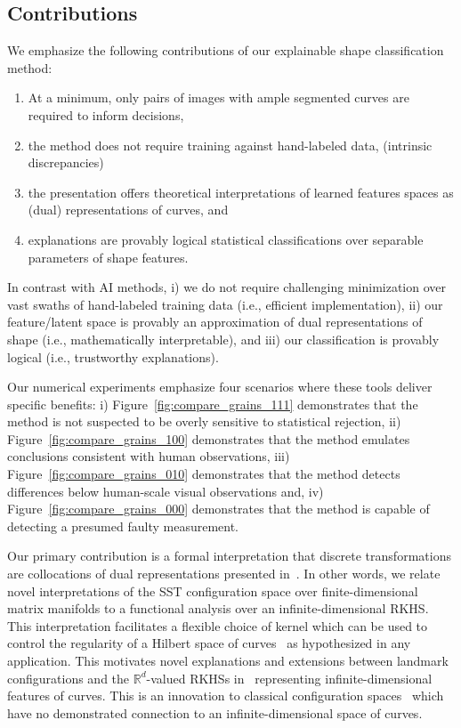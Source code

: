 \documentclass[pdflatex,iicol]{sn-jnl}%
\theoremstyle{thmstyleone}%
\theoremstyle{thmstyletwo}%
\theoremstyle{thmstylethree}%
\begin{document}
\subsection{Contributions}
We emphasize the following contributions of our explainable shape classification method:
\begin{enumerate}
    \item At a minimum, only pairs of images with ample segmented curves are required to inform decisions,
    \item the method does not require training against hand-labeled data, (intrinsic discrepancies)
    \item the presentation offers theoretical interpretations of learned features spaces as (dual) representations of curves, and 
    \item explanations are provably logical statistical classifications over separable parameters of shape features.
\end{enumerate}
 
 In contrast with AI methods, i) we do not require challenging minimization over vast swaths of hand-labeled training data (i.e., efficient implementation), ii) our feature/latent space is provably an approximation of dual representations of shape (i.e., mathematically interpretable), and iii) our classification is provably logical (i.e., trustworthy explanations).

Our numerical experiments emphasize four scenarios where these tools deliver specific benefits: i) Figure~\ref{fig:compare_grains_111} demonstrates that the method is not suspected to be overly sensitive to statistical rejection, ii) Figure~\ref{fig:compare_grains_100} demonstrates that the method emulates conclusions consistent with human observations, iii) Figure~\ref{fig:compare_grains_010} demonstrates that the method detects differences below human-scale visual observations and, iv) Figure~\ref{fig:compare_grains_000} demonstrates that the method is capable of detecting a presumed faulty measurement.

Our primary contribution is a formal interpretation that discrete transformations are collocations of dual representations presented in~\cite{micheli2013matrix}. In other words, we relate novel interpretations of the SST configuration space over finite-dimensional matrix manifolds to a functional analysis over an infinite-dimensional RKHS. This interpretation facilitates a flexible choice of kernel which can be used to control the regularity of a Hilbert space of curves~\cite{micheli2013matrix} as hypothesized in any application. This motivates novel explanations and extensions between landmark configurations and the $\mathbb{R}^d$-valued RKHSs in~\cite{micheli2013matrix} representing infinite-dimensional features of curves. This is an innovation to classical configuration spaces~\cite{kendall2009shape} which have no demonstrated connection to an infinite-dimensional space of curves.
\end{document}
